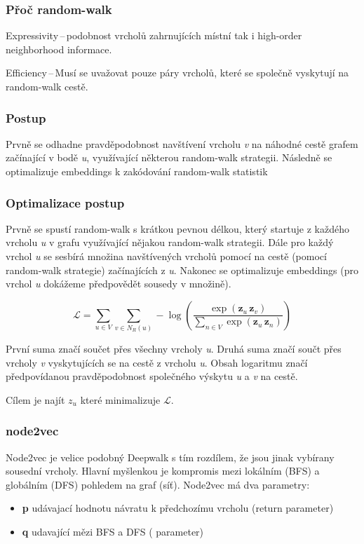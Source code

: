\subsubsection{Přoč random-walk}

Expressivity\,--\,podobnost vrcholů zahrnujících místní tak i high-order neighborhood informace.

Efficiency\,--\,Musí se uvažovat pouze páry vrcholů, které se společně vyskytují na random-walk cestě.

\subsubsection{Postup}

Prvně se odhadne pravděpodobnost navštívení vrcholu \textit{v} na náhodné cestě grafem začínající v bodě \textit{u}, využívající některou random-walk strategii. 
Následně se optimalizuje embeddings k zakódování random-walk statistik 

\subsubsection{Optimalizace postup}

Prvně se spustí random-walk s krátkou pevnou délkou, který startuje z každého vrcholu \textit{u} v grafu využívající nějakou random-walk strategii.
Dále pro každý vrchol \textit{u} se sesbírá množina navštívených vrcholů pomocí na cestě (pomocí random-walk strategie) začínajících z \textit{u}.
Nakonec se optimalizuje embeddings (pro vrchol \textit{u} dokážeme předpovědět sousedy v množině).

\[\mathcal{L} = \sum_{u\in V} \sum_{v\in N_R (u)} - \log(\frac{\exp(\mathbf{z}_{u}\,\mathbf{z}_{v})}{\sum_{n\in V} \exp(\mathbf{z}_{u}\,\mathbf{z}_{n})})\]

První suma značí součet přes všechny vrcholy \textit{u}.
Druhá suma značí součt přes vrcholy \textit{v} vyskytujících se na cestě z vrcholu \textit{u}.
Obsah logaritmu značí předpovídanou pravděpodobnost společného výskytu \textit{u} a \textit{v} na cestě.

Cílem je najít $z_u$ které minimalizuje $\mathcal{L}$.


\subsubsection{node2vec}

Node2vec je velice podobný Deepwalk s tím rozdílem, že jsou jinak vybírany sousední vrcholy.
Hlavní myšlenkou je kompromis mezi lokálním (BFS) a globálním (DFS) pohledem na graf (síť).
Node2vec má dva parametry:
\begin{itemize}
	\item \textbf{p} udávajací hodnotu návratu k předchozímu vrcholu (return parameter)
	\item \textbf{q} udavající  mězi BFS a DFS ( parameter)
\end{itemize}

